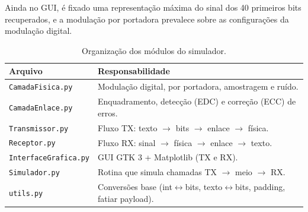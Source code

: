 \documentclass[a4paper, 11pt]{article}
\begin{document}
Ainda no GUI, é fixado uma representação máxima do sinal dos 40 primeiros bits recuperados, 
e a modulação por portadora prevalece sobre as configurações da modulação digital.


\begin{table}[H]
\centering
\small
\begin{tabular}{@{}ll@{}}
\toprule
\textbf{Arquivo} & \textbf{Responsabilidade} \\
\midrule
\texttt{CamadaFisica.py}     & Modulação digital, por portadora, amostragem e ruído. \\
\texttt{CamadaEnlace.py}     & Enquadramento, detecção (EDC) e correção (ECC) de erros. \\
\texttt{Transmissor.py}      & Fluxo TX: texto $\rightarrow$ bits $\rightarrow$ enlace $\rightarrow$ física. \\
\texttt{Receptor.py}         & Fluxo RX: sinal $\rightarrow$ física $\rightarrow$ enlace $\rightarrow$ texto. \\
\texttt{InterfaceGrafica.py} & GUI GTK 3 + Matplotlib (TX e RX). \\
\texttt{Simulador.py}        & Rotina que simula chamadas TX $\rightarrow$ meio $\rightarrow$ RX. \\
\texttt{utils.py}            & Conversões base (int$\leftrightarrow$bits, texto$\leftrightarrow$bits, padding, fatiar payload). \\
\bottomrule
\end{tabular}
\caption{Organização dos módulos do simulador.}
\label{tab:arquitetura}
\end{table}
\end{document}

